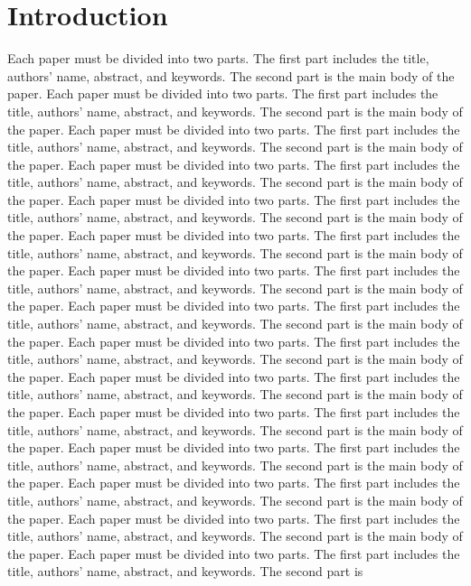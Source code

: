 \documentclass[fleqn,10pt,twocolumn]{ICCAS2018}
\begin{document}
\section{Introduction}
Each paper must be divided into two parts. The first part includes
the title, authors' name, abstract, and keywords. The second part is
the main body of the paper.
Each paper must be divided into two parts. The first part includes
the title, authors' name, abstract, and keywords. The second part is
the main body of the paper.
Each paper must be divided into two parts. The first part includes
the title, authors' name, abstract, and keywords. The second part is
the main body of the paper.
Each paper must be divided into two parts. The first part includes
the title, authors' name, abstract, and keywords. The second part is
the main body of the paper.
Each paper must be divided into two parts. The first part includes
the title, authors' name, abstract, and keywords. The second part is
the main body of the paper.
Each paper must be divided into two parts. The first part includes
the title, authors' name, abstract, and keywords. The second part is
the main body of the paper.
Each paper must be divided into two parts. The first part includes
the title, authors' name, abstract, and keywords. The second part is
the main body of the paper.
Each paper must be divided into two parts. The first part includes
the title, authors' name, abstract, and keywords. The second part is
the main body of the paper.
Each paper must be divided into two parts. The first part includes
the title, authors' name, abstract, and keywords. The second part is
the main body of the paper.
Each paper must be divided into two parts. The first part includes
the title, authors' name, abstract, and keywords. The second part is
the main body of the paper.
Each paper must be divided into two parts. The first part includes
the title, authors' name, abstract, and keywords. The second part is
the main body of the paper.
Each paper must be divided into two parts. The first part includes
the title, authors' name, abstract, and keywords. The second part is
the main body of the paper.
Each paper must be divided into two parts. The first part includes
the title, authors' name, abstract, and keywords. The second part is
the main body of the paper.
Each paper must be divided into two parts. The first part includes
the title, authors' name, abstract, and keywords. The second part is
the main body of the paper.
Each paper must be divided into two parts. The first part includes
the title, authors' name, abstract, and keywords. The second part is
\end{document}
